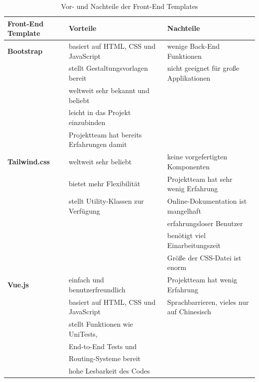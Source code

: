 \begin{table}[h]
	\begin{tabular}{|l|l|l|}
		\hline
		\textbf{Front-End Template} &\textbf{Vorteile}  & 	\textbf{Nachteile}    \\ \hline
		
		\textbf{Bootstrap}                   &
		
		basiert auf HTML, CSS und JavaScript & wenige Back-End Funktionen \\ 
		&
		stellt Gestaltungsvorlagen bereit 
		&   nicht geeignet für große Applikationen \\
	 &	weltweit sehr bekannt und beliebt&  \\
		&
		leicht in das Projekt einzubinden&  \\
		&
		Projektteam hat bereits Erfahrungen damit& 
		
		
		
		          \\ \hline
		          
		\textbf{Tailwind.css}        &
		 
		weltweit sehr beliebt & keine vorgefertigten Komponenten \\
		&
		bietet mehr Flexibilität & Projektteam hat sehr wenig Erfahrung \\
		&
		stellt Utility-Klassen zur Verfügung &  		  Online-Dokumentation ist mangelhaft \\
		& &  		  erfahrungsloser Benutzer  \\
		&&  		  benötigt viel Einarbeitungszeit\\
		&&		  Größe der CSS-Datei ist enorm \\
	
		       \hline
		      
		\textbf{Vue.js} &
		 einfach und benutzerfreundlich  & Projektteam hat wenig Erfahrung \\
		 &
		basiert auf HTML, CSS und JavaScript & 		 Sprachbarrieren, vieles nur auf Chinesisch \\
		&
		stellt Funktionen wie UniTests, & \\
		&
		 End-to-End Tests und & \\
		 &Routing-Systeme bereit  &  \\ 
		 &
		hohe Lesbarkeit des Codes & 
		
		                  \\ \hline
		                  
	\end{tabular}
	\caption{Vor- und Nachteile der Front-End Templates}
	\label{tab:Vor- und Nachteile der Front-End Templates}
\end{table}


